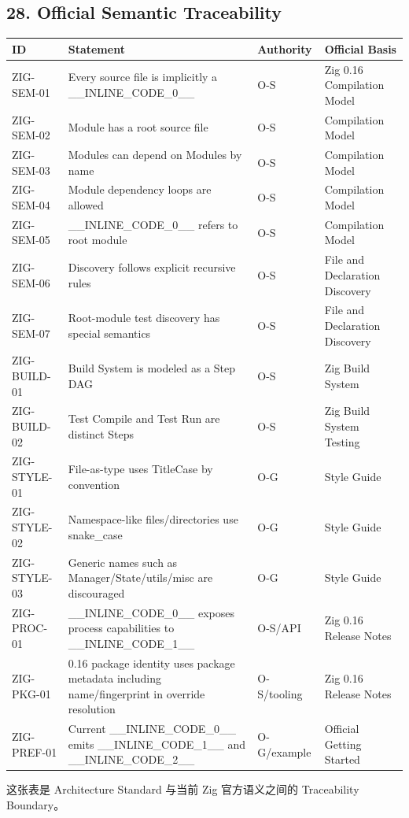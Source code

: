 \documentclass[11pt,a4paper]{article}
\begin{document}
\subsection{28. Official Semantic Traceability}
\begin{table}[htbp]
\centering
\small
\begin{tabularx}{\textwidth}{| X | X | X | X |}
\hline
\rowcolor{codebg}
\textbf{ID} & \textbf{Statement} & \textbf{Authority} & \textbf{Official Basis} \\ \hline
ZIG-SEM-01 & Every source file is implicitly a \_\_INLINE\_CODE\_0\_\_ & O-S & Zig 0.16 Compilation Model \\ \hline
\rowcolor{codebg!50} ZIG-SEM-02 & Module has a root source file & O-S & Compilation Model \\ \hline
ZIG-SEM-03 & Modules can depend on Modules by name & O-S & Compilation Model \\ \hline
\rowcolor{codebg!50} ZIG-SEM-04 & Module dependency loops are allowed & O-S & Compilation Model \\ \hline
ZIG-SEM-05 & \_\_INLINE\_CODE\_0\_\_ refers to root module & O-S & Compilation Model \\ \hline
\rowcolor{codebg!50} ZIG-SEM-06 & Discovery follows explicit recursive rules & O-S & File and Declaration Discovery \\ \hline
ZIG-SEM-07 & Root-module test discovery has special semantics & O-S & File and Declaration Discovery \\ \hline
\rowcolor{codebg!50} ZIG-BUILD-01 & Build System is modeled as a Step DAG & O-S & Zig Build System \\ \hline
ZIG-BUILD-02 & Test Compile and Test Run are distinct Steps & O-S & Zig Build System Testing \\ \hline
\rowcolor{codebg!50} ZIG-STYLE-01 & File-as-type uses TitleCase by convention & O-G & Style Guide \\ \hline
ZIG-STYLE-02 & Namespace-like files/directories use snake\_case & O-G & Style Guide \\ \hline
\rowcolor{codebg!50} ZIG-STYLE-03 & Generic names such as Manager/State/utils/misc are discouraged & O-G & Style Guide \\ \hline
ZIG-PROC-01 & \_\_INLINE\_CODE\_0\_\_ exposes process capabilities to \_\_INLINE\_CODE\_1\_\_ & O-S/API & Zig 0.16 Release Notes \\ \hline
\rowcolor{codebg!50} ZIG-PKG-01 & 0.16 package identity uses package metadata including name/fingerprint in override resolution & O-S/tooling & Zig 0.16 Release Notes \\ \hline
ZIG-PREF-01 & Current \_\_INLINE\_CODE\_0\_\_ emits \_\_INLINE\_CODE\_1\_\_ and \_\_INLINE\_CODE\_2\_\_ & O-G/example & Official Getting Started \\ \hline
\end{tabularx}
\end{table}
这张表是 Architecture Standard 与当前 Zig 官方语义之间的 Traceability Boundary。
\end{document}
